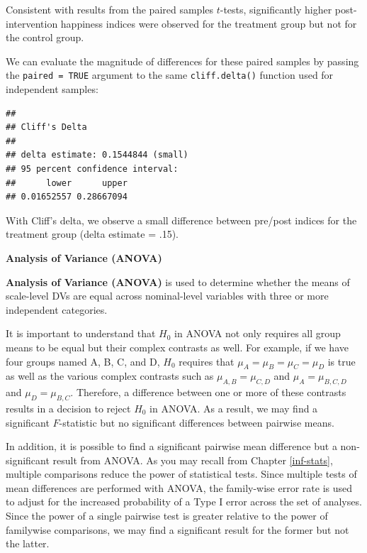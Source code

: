 \documentclass[]{book}
\newenvironment{Shaded}{\begin{snugshade}}{\end{snugshade}}
\newcommand{\CommentTok}[1]{\textcolor[rgb]{0.56,0.35,0.01}{\textit{#1}}}
\newcommand{\DataTypeTok}[1]{\textcolor[rgb]{0.13,0.29,0.53}{#1}}
\newcommand{\KeywordTok}[1]{\textcolor[rgb]{0.13,0.29,0.53}{\textbf{#1}}}
\newcommand{\NormalTok}[1]{#1}
\newcommand{\OperatorTok}[1]{\textcolor[rgb]{0.81,0.36,0.00}{\textbf{#1}}}
\newcommand{\OtherTok}[1]{\textcolor[rgb]{0.56,0.35,0.01}{#1}}
\begin{document}
Consistent with results from the paired samples \(t\)-tests, significantly higher post-intervention happiness indices were observed for the treatment group but not for the control group.

We can evaluate the magnitude of differences for these paired samples by passing the \texttt{paired\ =\ TRUE} argument to the same \texttt{cliff.delta()} function used for independent samples:

\begin{Shaded}
\end{Shaded}

\begin{verbatim}
## 
## Cliff's Delta
## 
## delta estimate: 0.1544844 (small)
## 95 percent confidence interval:
##      lower      upper 
## 0.01652557 0.28667094
\end{verbatim}

With Cliff's delta, we observe a small difference between pre/post indices for the treatment group (delta estimate = .15).

\textbf{Analysis of Variance (ANOVA)}

\textbf{Analysis of Variance (ANOVA)} is used to determine whether the means of scale-level DVs are equal across nominal-level variables with three or more independent categories.

It is important to understand that \(H_0\) in ANOVA not only requires all group means to be equal but their complex contrasts as well. For example, if we have four groups named A, B, C, and D, \(H_0\) requires that \(\mu_A = \mu_B = \mu_C = \mu_D\) is true as well as the various complex contrasts such as \(\mu_{A,B} = \mu_{C,D}\) and \(\mu_A = \mu_{B,C,D}\) and \(\mu_D = \mu_{B,C}\). Therefore, a difference between one or more of these contrasts results in a decision to reject \(H_0\) in ANOVA. As a result, we may find a significant \(F\)-statistic but no significant differences between pairwise means.

In addition, it is possible to find a significant pairwise mean difference but a non-significant result from ANOVA. As you may recall from Chapter \ref{inf-stats}, multiple comparisons reduce the power of statistical tests. Since multiple tests of mean differences are performed with ANOVA, the family-wise error rate is used to adjust for the increased probability of a Type I error across the set of analyses. Since the power of a single pairwise test is greater relative to the power of familywise comparisons, we may find a significant result for the former but not the latter.
\end{document}
